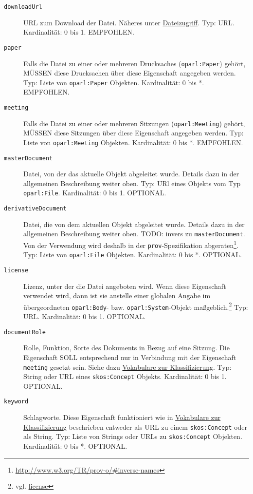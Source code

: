 \documentclass[,a4paper]{article}
\begin{document}
\begin{description}
\item[\texttt{downloadUrl}]
URL zum Download der Datei. Näheres unter
\hyperref[dateizugriff]{Dateizugriff}. Typ: URL. Kardinalität: 0 bis 1.
EMPFOHLEN.
\item[\texttt{paper}]
Falls die Datei zu einer oder mehreren Drucksaches
(\texttt{oparl:Paper}) gehört, MÜSSEN diese Drucksachen über diese
Eigenschaft angegeben werden. Typ: Liste von \texttt{oparl:Paper}
Objekten. Kardinalität: 0 bis *. EMPFOHLEN.
\item[\texttt{meeting}]
Falls die Datei zu einer oder mehreren Sitzungen
(\texttt{oparl:Meeting}) gehört, MÜSSEN diese Sitzungen über diese
Eigenschaft angegeben werden. Typ: Liste von \texttt{oparl:Meeting}
Objekten. Kardinalität: 0 bis *. EMPFOHLEN.
\item[\texttt{masterDocument}]
Datei, von der das aktuelle Objekt abgeleitet wurde. Details dazu in der
allgemeinen Beschreibung weiter oben. Typ: URl eines Objekts vom Typ
\texttt{oparl:File}. Kardinalität: 0 bis 1. OPTIONAL.
\item[\texttt{derivativeDocument}]
Datei, die von dem aktuellen Objekt abgeleitet wurde. Details dazu in
der allgemeinen Beschreibung weiter oben. TODO: invers zu
\texttt{masterDocument}. Von der Verwendung wird deshalb in der
\texttt{prov}-Spezifikation abgeraten\footnote{\url{http://www.w3.org/TR/prov-o/\#inverse-names}}.
Typ: Liste von \texttt{oparl:File} Objekten. Kardinalität: 0 bis *.
OPTIONAL.
\item[\texttt{license}]
Lizenz, unter der die Datei angeboten wird. Wenn diese Eigenschaft
verwendet wird, dann ist sie anstelle einer globalen Angabe im
übergeordneten \texttt{oparl:Body}- bzw. \texttt{oparl:System}-Objekt
maßgeblich.\footnote{vgl. \hyperref[eigenschaftux5flicense]{license}}
Typ: URL. Kardinalität: 0 bis 1. OPTIONAL.
\item[\texttt{documentRole}]
Rolle, Funktion, Sorte des Dokuments in Bezug auf eine Sitzung. Die
Eigenschaft SOLL entsprechend nur in Verbindung mit der Eigenschaft
\texttt{meeting} gesetzt sein. Siehe dazu
\hyperref[vokabulareux5fklassifizierung]{Vokabulare zur
Klassifizierung}. Typ: String oder URL eines \texttt{skos:Concept}
Objekts. Kardinalität: 0 bis 1. OPTIONAL.
\item[\texttt{keyword}]
Schlagworte. Diese Eigenschaft funktioniert wie in
\hyperref[vokabulareux5fklassifizierung]{Vokabulare zur Klassifizierung}
beschrieben entweder als URL zu einem \texttt{skos:Concept} oder als
String. Typ: Liste von Strings oder URLs zu \texttt{skos:Concept}
Objekten. Kardinalität: 0 bis *. OPTIONAL.
\end{description}
\end{document}
